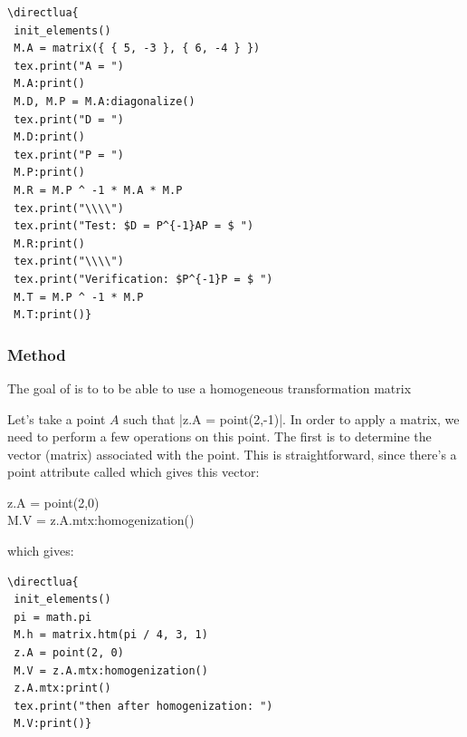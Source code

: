 \begin{minipage}{.5\textwidth}
\begin{verbatim}
\directlua{
 init_elements()
 M.A = matrix({ { 5, -3 }, { 6, -4 } })
 tex.print("A = ")
 M.A:print()
 M.D, M.P = M.A:diagonalize()
 tex.print("D = ")
 M.D:print()
 tex.print("P = ")
 M.P:print()
 M.R = M.P ^ -1 * M.A * M.P
 tex.print("\\\\")
 tex.print("Test: $D = P^{-1}AP = $ ")
 M.R:print()
 tex.print("\\\\")
 tex.print("Verification: $P^{-1}P = $ ")
 M.T = M.P ^ -1 * M.P
 M.T:print()}
\end{verbatim}
\end{minipage}
\begin{minipage}{.5\textwidth}
\end{minipage}

\subsubsection{Method }
\label{ssub:method_homogenization}

The goal of  is to to be able to use a homogeneous transformation matrix

Let's take a point $A$ such that |z.A = point(2,-1)|. In order to apply a   matrix, we need to perform a few operations on this point. The first is to determine the vector (matrix) associated with the point. This is straightforward, since there's a point attribute called  which gives this vector:

\begin{mybox}
z.A = point(2,0)\\
M.V = z.A.mtx:homogenization()
\end{mybox}
which gives:

\begin{minipage}{.5\textwidth}
\begin{verbatim}
\directlua{
 init_elements()
 pi = math.pi
 M.h = matrix.htm(pi / 4, 3, 1)
 z.A = point(2, 0)
 M.V = z.A.mtx:homogenization()
 z.A.mtx:print()
 tex.print("then after homogenization: ")
 M.V:print()}
\end{verbatim}
\end{minipage}
\begin{minipage}{.5\textwidth}
\end{minipage}

